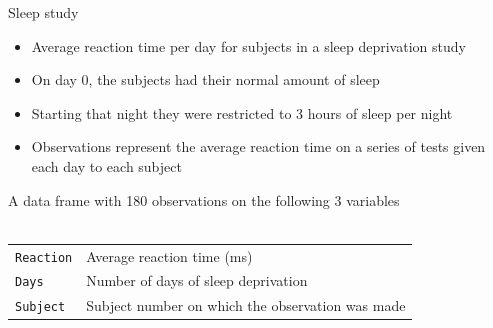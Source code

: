 \documentclass[aspectratio=169]{beamer}
\begin{document}
\begin{frame}{Sleep study}
  \begin{itemize}
    \item Average reaction time per day for subjects in a sleep deprivation
      study
    \item On day 0, the subjects had their normal amount of sleep
    \item Starting that night they were restricted to 3 hours of sleep per
      night
    \item Observations represent the average reaction time on a series of
      tests given each day to each subject
  \end{itemize}

  \vfill
  A data frame with 180 observations on the following 3 variables\\~\\

  \begin{tabular}{ll}
    \hline
     \texttt{Reaction} & Average reaction time (ms) \\
     \texttt{Days} & Number of days of sleep deprivation \\
     \texttt{Subject} & Subject number on which the observation was made \\
     \hline
  \end{tabular}
\end{frame}

\end{document}
